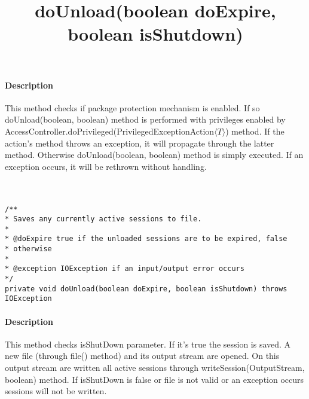 \paragraph{Description} This method checks if package protection mechanism is enabled. If so doUnload(boolean, boolean) method is performed with privileges enabled by AccessController.doPrivileged(PrivilegedExceptionAction$\langle T \rangle$) method. If the action's method throws an exception, it will propagate through the latter method. Otherwise doUnload(boolean, boolean) method is simply executed. If an exception occurs, it will be rethrown without handling.\\\\\\

\title{{\large \textbf{doUnload(boolean doExpire, boolean isShutdown)}}}
\lstset{firstnumber=657}
\begin{lstlisting}
/**
* Saves any currently active sessions to file.
*
* @doExpire true if the unloaded sessions are to be expired, false
* otherwise
*
* @exception IOException if an input/output error occurs
*/
private void doUnload(boolean doExpire, boolean isShutdown) throws IOException
\end{lstlisting}
\paragraph{Description} This method checks isShutDown parameter. If it's true the session is saved. A new file (through file() method) and its output stream are opened. On this output stream are written all active sessions through writeSession(OutputStream, boolean) method. If isShutDown is false or file is not valid or an exception occurs sessions will not be written.

